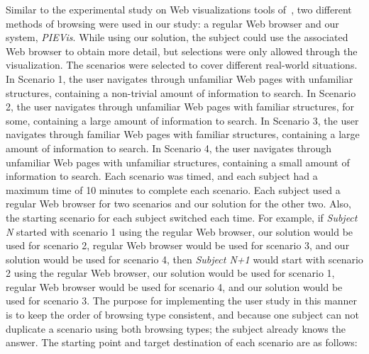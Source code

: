 \documentclass[]{article}
\begin{document}
{Similar to the experimental study on Web visualizations tools of~\cite{hh-01}, two different methods of browsing were used in our study: a regular Web browser and our system, {\em PIEVis}.
While using our solution, the subject could use the associated Web browser to obtain more detail, but selections were only allowed through the visualization.
The scenarios were selected to cover different real-world situations.
In Scenario 1, the user navigates through unfamiliar Web pages with unfamiliar structures, containing a non-trivial amount of information to search.
In Scenario 2, the user navigates through unfamiliar Web pages with familiar structures, for some, containing a large amount of information to search.
In Scenario 3, the user navigates through familiar Web pages with familiar structures, containing a large amount of information to search.
In Scenario 4, the user navigates through unfamiliar Web pages with unfamiliar structures, containing a small amount of information to search.
Each scenario was timed, and each subject had a maximum time of 10 minutes to complete each scenario.
Each subject used a regular Web browser for two scenarios and our solution for the other two.
Also, the starting scenario for each subject switched each time.  For example, if {\em Subject N} started with scenario 1 using the regular Web browser, our solution would be used for scenario 2, regular Web browser would be used for scenario 3, and our solution would be used for scenario 4, then {\em Subject N+1} would start with scenario 2 using the regular Web browser, our solution would be used for scenario 1, regular Web browser would be used for scenario 4, and our solution would be used for scenario 3.
The purpose for implementing the user study in this manner is to keep the order of browsing type consistent, and because one subject can not duplicate a scenario using both browsing types; the subject already knows the answer.
The starting point and target destination of each scenario are as follows:


}
\end{document}
